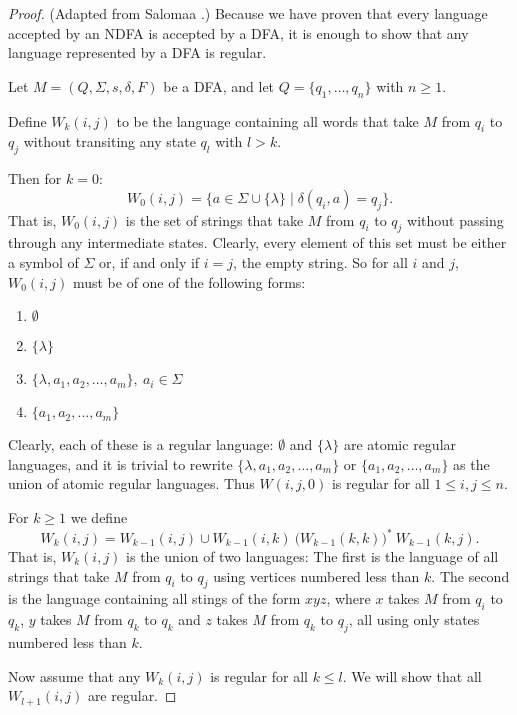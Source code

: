 \documentclass{bcthesis}
\newcommand{\footcite}[2]{\xspace\cite[pg.~{#2}]{#1}\xspace}
\begin{document}
	\begin{proof}
		(Adapted from Salomaa \footcite{salomaa}{29}.)
		Because we have proven that every language accepted by an NDFA is accepted by a DFA, it is enough to show that any language represented by a DFA is regular.

		Let $M = (Q, \Sigma, s, \delta, F)$ be a DFA, and let $Q = \{ q_1, \dots, q_n \}$ with $n \geq 1$.

		Define $W_k(i, j)$ to be the language containing all words that take $M$ from $q_i$ to $q_j$ without transiting any state $q_l$ with $l > k$.

		Then for $k = 0$:
		\[
			W_0(i, j) = \{ a \in \Sigma \cup \{ \lambda \} \mid \delta(q_i, a) = q_j \}.
		\]
		That is, $W_0(i, j)$ is the set of strings that take $M$ from $q_i$ to $q_j$ without passing through any intermediate states.
		Clearly, every element of this set must be either a symbol of $\Sigma$ or, if and only if $i = j$, the empty string.
		So for all $i$ and $j$, $W_0(i, j)$ must be of one of the following forms:
		\begin{enumerate}[label=(\roman*), itemsep = -0.3 ex, nolistsep]
			\item $\emptyset$
			\item $\{ \lambda \}$
			\item $\{ \lambda, a_1, a_2, \dots, a_m \}, \ a_i \in \Sigma$
			\item $\{ a_1, a_2, \dots, a_m \}$
		\end{enumerate}
		Clearly, each of these is a regular language:
		$\emptyset$ and $\{ \lambda \}$ are atomic regular languages, and it is trivial to rewrite $\{ \lambda, a_1, a_2, \dots, a_m \}$ or $\{ a_1, a_2, \dots, a_m \}$ as the union of atomic regular languages.
		Thus $W(i, j, 0)$ is regular for all $1 \leq i, j \leq n$.

		For $k \geq 1$ we define
		\[
			W_k(i, j) = W_{k-1}(i, j) \cup W_{k-1}(i, k) \ \big(W_{k-1}(k, k)\big)^* \ W_{k-1}(k, j).
		\]
		That is, $W_k(i, j)$ is the union of two languages:
		The first is the language of all strings that take $M$ from $q_i$ to $q_j$ using vertices numbered less than $k$.
		The second is the language containing all stings of the form $xyz$, where $x$ takes $M$ from $q_i$ to $q_k$, $y$ takes $M$ from $q_k$ to $q_k$ and $z$ takes $M$ from $q_k$ to $q_j$, all using only states numbered less than $k$.

		Now assume that any $W_k(i, j)$ is regular for all $k \leq l$.
		We will show that all $W_{l+1}(i, j)$ are regular.


\end{proof}
\end{document}
